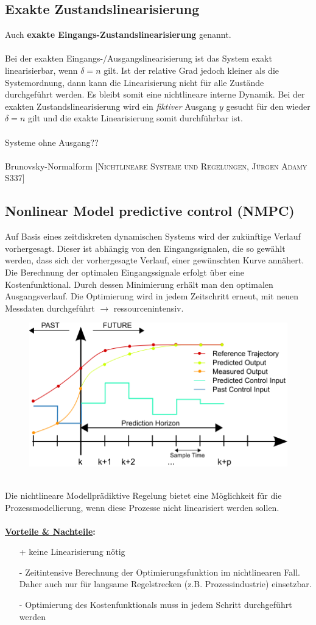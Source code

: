 	\subsection{Exakte Zustandslinearisierung}
		Auch \textbf{exakte Eingangs-Zustandslinearisierung} genannt.\\\\
		Bei der exakten Eingangs-/Ausgangslinearisierung ist das System exakt linearisierbar, wenn $ \delta=n $ gilt. Ist der relative Grad jedoch kleiner als die Systemordnung, dann kann die Linearisierung nicht für alle Zustände durchgeführt werden. Es bleibt somit eine nichtlineare interne Dynamik. Bei der exakten Zustandslinearisierung wird ein \textit{fiktiver} Ausgang $ y $ gesucht für den wieder $ \delta=n $ gilt und die exakte Linearisierung somit durchführbar ist.\\\\
		Systeme ohne Ausgang??\\\\
		Brunovsky-Normalform [\textsc{Nichtlineare Systeme und Regelungen, Jürgen Adamy S337}]
		
	\subsection{Nonlinear Model predictive control (NMPC)}
		Auf Basis eines zeitdiskreten dynamischen Systems wird der zukünftige Verlauf vorhergesagt. Dieser ist abhängig von den Eingangssignalen, die so gewählt werden, dass sich der vorhergesagte Verlauf, einer gewünschten Kurve annähert. Die Berechnung der optimalen Eingangssignale erfolgt über eine Kostenfunktional. Durch dessen Minimierung erhält man den optimalen Ausgangsverlauf. Die Optimierung wird in jedem Zeitschritt erneut, mit neuen Messdaten durchgeführt $ \rightarrow  $ ressourcenintensiv.
		\begin{figure}[h!]
			\centering
			\includegraphics[width=0.5\linewidth]{./pics/re/nmpc}
		\end{figure}\\
		Die nichtlineare Modellprädiktive Regelung bietet eine Möglichkeit für die Prozessmodellierung, wenn diese Prozesse nicht linearisiert werden sollen.\\\\
		\textbf{\underline{Vorteile \& Nachteile}:}
		\begin{itemize}
			\item[+] keine Linearisierung nötig
			\item[-] Zeitintensive Berechnung der Optimierungsfunktion im nichtlinearen Fall. Daher auch nur für langsame Regelstrecken (z.B. Prozessindustrie) einsetzbar.
			\item[-] Optimierung des Kostenfunktionals muss in jedem Schritt durchgeführt werden
		\end{itemize}
